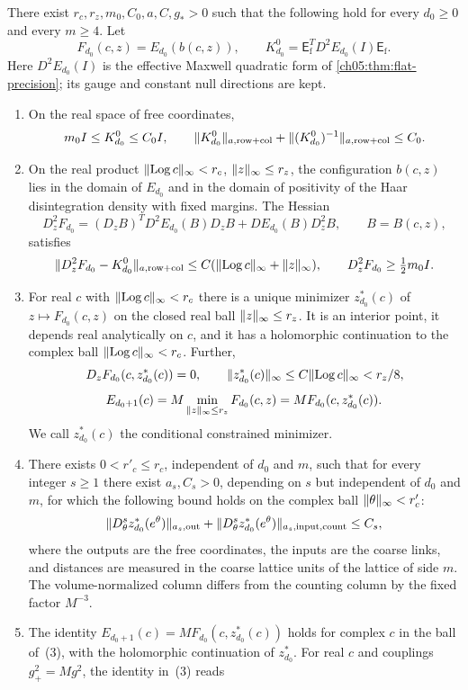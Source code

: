 \begin{theorem}\label{ch07:thm:bellman}
There exist $r_c,r_z,m_0,C_0,a,C,g_*>0$ such that the following hold for every $d_0\ge0$ and every $m\ge4$. Let
\[
 F_{d_0}(c,z)=E_{d_0}(b(c,z)),\qquad
 K_{d_0}^0=\mathsf E_{\mathrm f}^TD^2E_{d_0}(I)\mathsf E_{\mathrm f}.
\]
Here $D^2E_{d_0}(I)$ is the effective Maxwell quadratic form of \cref{ch05:thm:flat-precision}; its gauge and constant null directions are kept.
\begin{enumerate}
\item On the real space of free coordinates,
\[
 m_0I\le K_{d_0}^0\le C_0I,\qquad
 \lVert K_{d_0}^0\rVert_{a,\mathrm{row+col}}+\lVert (K_{d_0}^0)^{-1}\rVert_{a,\mathrm{row+col}}\le C_0 .
\]
\item On the real product $\lVert \operatorname{Log} c\rVert_\infty<r_c$, $\lVert z\rVert_\infty\le r_z$, the configuration $b(c,z)$ lies in the domain of $E_{d_0}$ and in the domain of positivity of the Haar disintegration density with fixed margins. The Hessian
\[
 D_z^2F_{d_0}=(D_zB)^TD^2E_{d_0}(B)D_zB+DE_{d_0}(B)D_z^2B,\qquad B=B(c,z),
\]
satisfies
\[
 \lVert D_z^2F_{d_0}-K_{d_0}^0\rVert_{a,\mathrm{row+col}}\le C(\lVert \operatorname{Log} c\rVert_\infty+\lVert z\rVert_\infty),\qquad
 D_z^2F_{d_0}\ge\tfrac12m_0I .
\]
\item For real $c$ with $\lVert \operatorname{Log} c\rVert_\infty<r_c$ there is a unique minimizer $z_{d_0}^*(c)$ of $z\mapsto F_{d_0}(c,z)$ on the closed real ball $\lVert z\rVert_\infty\le r_z$. It is an interior point, it depends real analytically on $c$, and it has a holomorphic continuation to the complex ball $\lVert \operatorname{Log} c\rVert_\infty<r_c$. Further,
\[
 D_zF_{d_0}(c,z_{d_0}^*(c))=0,\qquad\lVert z_{d_0}^*(c)\rVert_\infty\le C\lVert \operatorname{Log} c\rVert_\infty<r_z/8,
\]
\[
 E_{d_0+1}(c)=M\min_{\lVert z\rVert_\infty\le r_z}F_{d_0}(c,z)=MF_{d_0}(c,z_{d_0}^*(c)).
\]
We call $z_{d_0}^*(c)$ the conditional constrained minimizer.
\item There exists $0<r'_c\le r_c$, independent of $d_0$ and $m$, such that for every integer $s\ge1$ there exist $a_s,C_s>0$, depending on $s$ but independent of $d_0$ and $m$, for which the following bound holds on the complex ball $\lVert \theta\rVert_\infty<r'_c$:
\[
 \lVert D_\theta^sz_{d_0}^*(e^\theta)\rVert_{a_s,\mathrm{out}}+\lVert D_\theta^sz_{d_0}^*(e^\theta)\rVert_{a_s,\mathrm{input,count}}\le C_s,
\]
where the outputs are the free coordinates, the inputs are the coarse links, and distances are measured in the coarse lattice units of the lattice of side $m$. The volume-normalized column differs from the counting column by the fixed factor $M^{-3}$.
\item The identity $E_{d_0+1}(c)=MF_{d_0}(c,z_{d_0}^*(c))$ holds for complex $c$ in the ball of~(3), with the holomorphic continuation of $z_{d_0}^*$. For real $c$ and couplings $g_+^2=Mg^2$, the identity in~(3) reads

\end{enumerate}
\end{theorem}
